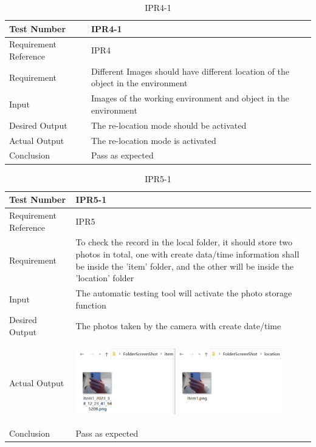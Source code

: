 \documentclass[12pt, titlepage]{article}
\begin{document}
\begin{table}[H]
\begin{center}
\begin{tabular}{|l | m{9cm}|}
\hline
  Test Number & IPR4-1\\
  \hline
  Requirement Reference & IPR4\\
  \hline
  Requirement & Different Images should have different location of the object in the environment\\
  \hline
  Input & Images of the working environment and object in the environment\\
  \hline
  Desired Output & The re-location mode should be activated\\
  \hline
  Actual Output & The re-location mode is activated\\
  \hline
  Conclusion & Pass as expected\\
  \hline
\end{tabular}
\end{center}       
\caption{IPR4-1}
\end{table}

\begin{table}[H]
\begin{center}
\begin{tabular}{|l | m{9cm}|}
\hline
  Test Number & IPR5-1\\
  \hline
  Requirement Reference & IPR5\\
  \hline
  Requirement & To check the record in the local folder, it should store two photos in total, one with create data/time information shall be inside the 'item' folder, and the other will be inside the 'location' folder\\
  \hline
  Input & The automatic testing tool will activate the photo storage function\\
  \hline
  Desired Output & The photos taken by the camera with create date/time\\
  \hline
  Actual Output & \includegraphics[width=90mm, height=35mm]{UT2.png}\\
  \hline
  Conclusion & Pass as expected\\
  \hline
\end{tabular}
\end{center}       
\caption{IPR5-1}
\end{table}
\newpage
\end{document}
